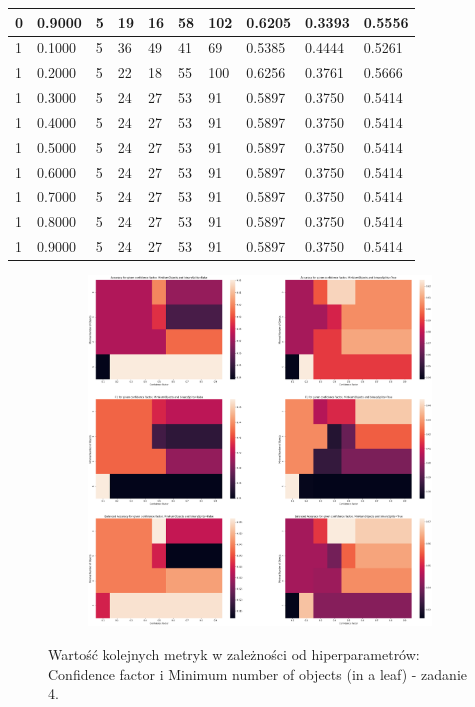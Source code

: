 \documentclass[12pt]{article}
\begin{document}
\begin{table}
{\begin{tabular}{| l | l | l | l | l | l | l | l | l | l |}
			0 & 0.9000 & 5 & 19 & 16 & 58 & 102 & 0.6205 & 0.3393 & 0.5556\\ \hline
			1 & 0.1000 & 5 & 36 & 49 & 41 & 69 & 0.5385 & 0.4444 & 0.5261\\ \hline
			1 & 0.2000 & 5 & 22 & 18 & 55 & 100 & 0.6256 & 0.3761 & 0.5666\\ \hline
			1 & 0.3000 & 5 & 24 & 27 & 53 & 91 & 0.5897 & 0.3750 & 0.5414\\ \hline
			1 & 0.4000 & 5 & 24 & 27 & 53 & 91 & 0.5897 & 0.3750 & 0.5414\\ \hline
			1 & 0.5000 & 5 & 24 & 27 & 53 & 91 & 0.5897 & 0.3750 & 0.5414\\ \hline
			1 & 0.6000 & 5 & 24 & 27 & 53 & 91 & 0.5897 & 0.3750 & 0.5414\\ \hline
			1 & 0.7000 & 5 & 24 & 27 & 53 & 91 & 0.5897 & 0.3750 & 0.5414\\ \hline
			1 & 0.8000 & 5 & 24 & 27 & 53 & 91 & 0.5897 & 0.3750 & 0.5414\\ \hline
			1 & 0.9000 & 5 & 24 & 27 & 53 & 91 & 0.5897 & 0.3750 & 0.5414\\ \hline
			
		\end{tabular}
	}
	\end{table}
\clearpage
\begin{figure}[h!]
	\centering
	\begin{subfigure}[b]{1\linewidth}
		\includegraphics[width=\linewidth]{Train_sub.png}
	\end{subfigure}
	\label{fig:Chosen}
	\caption{Wartość kolejnych metryk w zależności od hiperparametrów: Confidence factor i Minimum number of objects (in a leaf) - zadanie 4.}
\end{figure}
\end{document}
